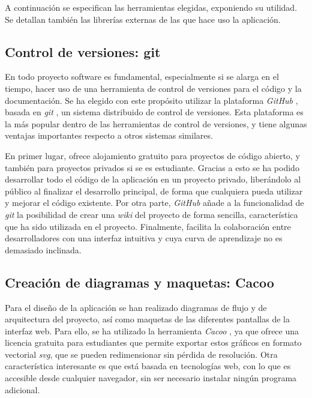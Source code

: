 A continuación se especifican las herramientas elegidas, exponiendo su utilidad.
Se detallan también las librerías externas de las que hace uso la aplicación.

\subsection*{Control de versiones: git\label{ssec:dp:git}}

En todo proyecto software es fundamental, especialmente si se alarga en el tiempo, hacer uso de una herramienta de control de versiones para el código y la documentación. Se ha elegido con este propósito utilizar la plataforma \textit{GitHub} \cite{github}, basada en \textit{git} \cite{git}, un sistema distribuido de control de versiones.
Esta plataforma es la más popular dentro de las herramientas de control de versiones, y tiene algunas ventajas importantes respecto a otros sistemas similares.

En primer lugar, ofrece alojamiento gratuito para proyectos de código abierto, y también para proyectos privados si se es estudiante. Gracias a esto se ha podido desarrollar todo el código de la aplicación en un proyecto privado, liberándolo al público al finalizar el desarrollo principal, de forma que cualquiera pueda utilizar y mejorar el código existente. 
Por otra parte, \textit{GitHub} añade a la funcionalidad de \textit{git} la posibilidad de crear una \textit{wiki} del proyecto de forma sencilla, característica que ha sido utilizada en el proyecto.
Finalmente, facilita la colaboración entre desarrolladores con una interfaz intuitiva y cuya curva de aprendizaje no es demasiado inclinada. 

\subsection*{Creación de diagramas y maquetas: Cacoo\label{ssec:dp:cacoo}}

Para el diseño de la aplicación se han realizado diagramas de flujo y de arquitectura del proyecto, así como maquetas de las diferentes pantallas de la interfaz web.
Para ello, se ha utilizado la herramienta \textit{Cacoo} \cite{cacoo}, ya que ofrece una licencia gratuita para estudiantes que permite exportar estos gráficos en formato vectorial \textit{svg}, que se pueden redimensionar sin pérdida de resolución.
Otra característica interesante es que está basada en tecnologías web, con lo que es accesible desde cualquier navegador, sin ser necesario instalar ningún programa adicional.

